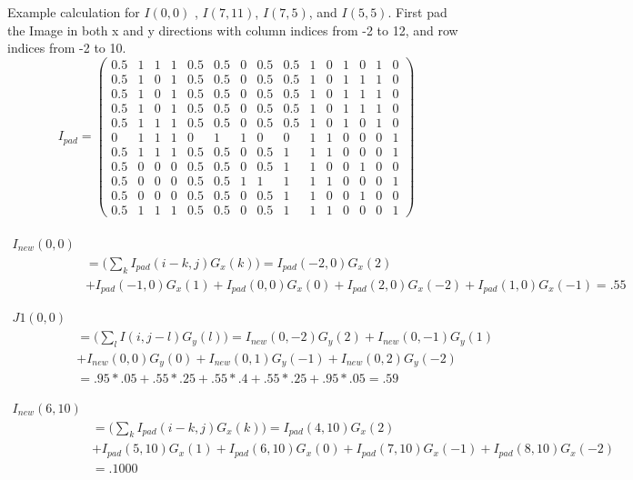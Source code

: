 \documentclass[11pt,english]{article}
\begin{document}
Example calculation for $I(0,0)$ , $I(7,11)$, $I(7,5)$, and $I(5,5)$.
First pad the Image in both x and y directions with column indices from  -2 to 12, and row indices from -2 to 10. 
$$
 I_{pad} = \begin{pmatrix}
0.5 & 1 & 1 & 1 & 0.5 & 0.5 & 0 & 0.5 & 0.5 & 1 & 0 & 1 & 0 & 1 & 0 \\
0.5 & 1 & 0 & 1 & 0.5 & 0.5 & 0 & 0.5 & 0.5 & 1 & 0 & 1 & 1 & 1 & 0 \\
0.5 & 1 & 0 & 1 & 0.5 & 0.5 & 0 & 0.5 & 0.5 & 1 & 0 & 1 & 1 & 1 & 0 \\
0.5 & 1 & 0 & 1 & 0.5 & 0.5 & 0 & 0.5 & 0.5 & 1 & 0 & 1 & 1 & 1 & 0 \\
0.5 & 1 & 1 & 1 & 0.5 & 0.5 & 0 & 0.5 & 0.5 & 1 & 0 & 1 & 0 & 1 & 0 \\
0   & 1 & 1 & 1 & 0   & 1   & 1 & 0   & 0   & 1 & 1 & 0 & 0 & 0 & 1 \\
0.5 & 1 & 1 & 1 & 0.5 & 0.5 & 0 & 0.5 & 1   & 1 & 1 & 0 & 0 & 0 & 1 \\
0.5 & 0 & 0 & 0 & 0.5 & 0.5 & 0 & 0.5 & 1   & 1 & 0 & 0 & 1 & 0 & 0 \\
0.5 & 0 & 0 & 0 & 0.5 & 0.5 & 1 & 1   & 1   & 1 & 1 & 0 & 0 & 0 & 1 \\
0.5 & 0 & 0 & 0 & 0.5 & 0.5 & 0 & 0.5 & 1   & 1 & 0 & 0 & 1 & 0 & 0 \\
0.5 & 1 & 1 & 1 & 0.5 & 0.5 & 0 & 0.5 & 1   & 1 & 1 & 0 & 0 & 0 & 1
\end{pmatrix}
$$
\\
\begin{align*}
I_{new}(0,0) \\
&= \big(\sum_k I_{pad}(i -k, j) G_x(k)\big)  = I_{pad} (-2,0)G_x(2) \\ 
&+ I_{pad} (-1,0)G_x(1) +  I_{pad} (0,0)G_x(0)  + I_{pad}(2,0)G_x(-2) +  I_{pad} (1,0)G_x(-1) = .55  
\end{align*}

\begin{align*}
J1(0,0) \\
&=\big(\sum_l I(i , j-l) G_y(l)\big)  =  I_{new} (0,-2)G_y(2) + I_{new} (0,-1)G_y(1) \\
&+ I_{new}(0,0)G_y(0)  + I_{new}(0,1)G_y(-1) +  I_{new}(0,2)G_y(-2)\\
 &=.95*.05 + .55*.25 + .55*.4 + .55*.25 + .95*.05=  .59 
\end{align*}

\begin{align*}
 I_{new}(6,10)\\
 &= \big(\sum_k I_{pad}(i -k, j) G_x(k)\big)  = I_{pad} (4,10)G_x(2) \\ 
&+ I_{pad} (5,10)G_x(1) +  I_{pad} (6,10)G_x(0)  + I_{pad}(7,10)G_x(-1) +  I_{pad} (8,10)G_x(-2)  \\
&= .1000  
\end{align*}
\end{document}
